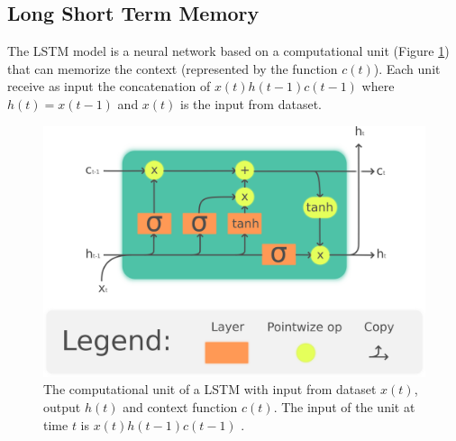 \documentclass[letterpaper]{article}%
\begin{document}
\subsection{Long Short Term Memory}
The LSTM model is a neural network based on a computational unit (Figure \ref{fig:computational_unit}) that can memorize the context (represented by the function $ c(t) $). Each unit receive as input the concatenation of $ x(t)h(t-1)c(t-1) $ where $ h(t) = x(t-1) $ and $ x(t) $ is the input from dataset.
\begin{figure}[!h]
	\includegraphics[width=\columnwidth]{img/computational_unit}
	\caption{The computational unit of a LSTM with input from dataset $ x(t) $, output $ h(t) $ and context function $ c(t) $. The input of the unit at time $ t $ is $ x(t)h(t-1)c(t-1) $ .}
	\label{fig:computational_unit}
\end{figure}
\end{document}
